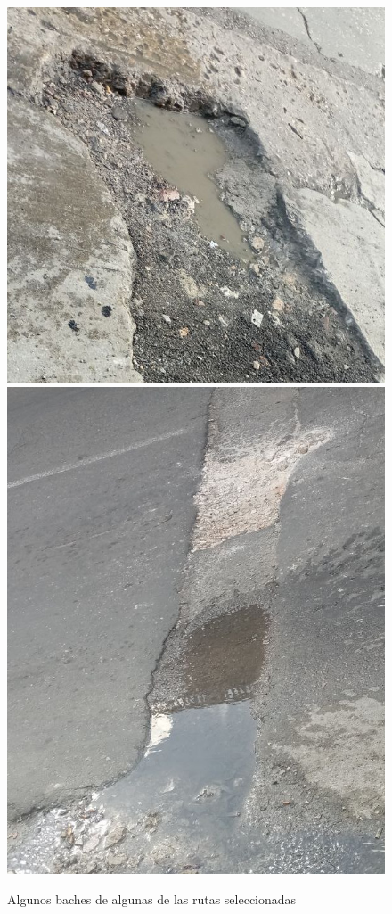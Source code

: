 		\begin{figure}[htb]
			\centering
			\includegraphics[scale = 0.3]{Graphics/pothole_1.jpg}
			\includegraphics[scale = 0.3]{Graphics/pothole_2.jpg}
			\caption{Algunos baches de algunas de las rutas seleccionadas}
			\label{fig:18}
		\end{figure}

